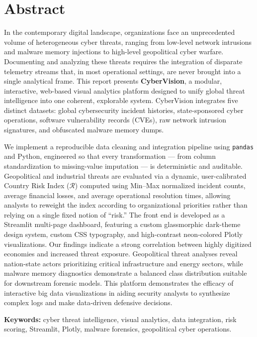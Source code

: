 \documentclass[a4paper, 12pt]{report}
\begin{document}
\newpage
\onehalfspacing

\chapter*{Abstract}
In the contemporary digital landscape, organizations face an unprecedented volume of heterogeneous cyber threats, ranging from low-level network intrusions and malware memory injections to high-level geopolitical cyber warfare. Documenting and analyzing these threats requires the integration of disparate telemetry streams that, in most operational settings, are never brought into a single analytical frame. This report presents \textbf{CyberVision}, a modular, interactive, web-based visual analytics platform designed to unify global threat intelligence into one coherent, explorable system. CyberVision integrates five distinct datasets: global cybersecurity incident histories, state-sponsored cyber operations, software vulnerability records (CVEs), raw network intrusion signatures, and obfuscated malware memory dumps.

We implement a reproducible data cleaning and integration pipeline using \texttt{pandas} and Python, engineered so that every transformation --- from column standardization to missing-value imputation --- is deterministic and auditable. Geopolitical and industrial threats are evaluated via a dynamic, user-calibrated Country Risk Index ($\mathcal{R}$) computed using Min--Max normalized incident counts, average financial losses, and average operational resolution times, allowing analysts to reweight the index according to organizational priorities rather than relying on a single fixed notion of ``risk.'' The front end is developed as a Streamlit multi-page dashboard, featuring a custom glassmorphic dark-theme design system, custom CSS typography, and high-contrast neon-colored Plotly visualizations. Our findings indicate a strong correlation between highly digitized economies and increased threat exposure. Geopolitical threat analyses reveal nation-state actors prioritizing critical infrastructure and energy sectors, while malware memory diagnostics demonstrate a balanced class distribution suitable for downstream forensic models. This platform demonstrates the efficacy of interactive big data visualizations in aiding security analysts to synthesize complex logs and make data-driven defensive decisions.

\noindent \textbf{Keywords:} cyber threat intelligence, visual analytics, data integration, risk scoring, Streamlit, Plotly, malware forensics, geopolitical cyber operations.
\end{document}
